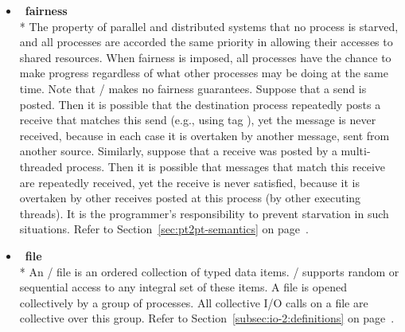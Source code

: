\begin{itemize}
\label{glossary:fairness}
\item  ~\hypertarget{glossary:fairness}{\textbf{fairness}} \\*
The property of parallel and distributed systems that no process is starved, 
and all processes are accorded the same priority in allowing their accesses 
to shared resources. When fairness is imposed, all processes have the 
chance to make progress regardless of what other processes may be 
doing at the same time. Note that \MPI/  makes no fairness guarantees.
Suppose that a send is posted.  Then it is possible
that the destination process repeatedly posts a receive that matches this
send (e.g., using tag ), yet the message is never received, because in each case it is overtaken by
another message, sent from another source.  Similarly, suppose that a
receive was posted by a multi-threaded process.  Then it is possible that
messages that
match this receive are repeatedly received, yet the receive is never satisfied,
because it is overtaken by other receives posted at this process (by
other executing threads).  It is the programmer's responsibility to prevent
starvation in such situations.
Refer to Section~\ref{sec:pt2pt-semantics} on page~\pageref{sec:pt2pt-semantics}.

\label{glossary:file}
\item  ~\hypertarget{glossary:file}{\textbf{file}} \\*
An \MPI/ file is an ordered collection of typed data items.
\MPI/ supports random or sequential access to any integral set of these items.
A file is opened collectively by a group of processes.
All collective I/O calls on a file are collective over this group.
Refer to Section~\ref{subsec:io-2:definitions} on page~\pageref{subsec:io-2:definitions}.


\end{itemize}
